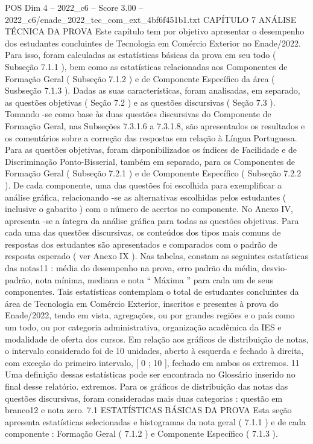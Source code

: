 \begin{textsample}{POS Dim 4 – 2022\_c6 – Score 3.00 – 2022\_c6/enade\_2022\_tec\_com\_ext\_4bf6f451b1.txt}  \label{ex:f4_pos_084}
CAPÍTULO 7 ANÁLISE TÉCNICA DA PROVA Este capítulo tem por objetivo apresentar o desempenho dos estudantes concluintes de Tecnologia em Comércio Exterior no Enade/2022.
Para isso, foram calculadas as estatísticas básicas da prova em seu todo ( Subseção 7.1.1 ), bem como as estatísticas relacionadas aos Componentes de Formação Geral ( Subseção 7.1.2 ) e de Componente Específico da área ( Susbseção 7.1.3 ).
Dadas as suas características, foram analisadas, em separado, as questões objetivas ( Seção 7.2 ) e as questões discursivas ( Seção 7.3 ).
Tomando -se como base às duas questões discursivas do Componente de Formação Geral, nas Subseções 7.3.1.6 a 7.3.1.8, são apresentados os resultados e os comentários sobre a correção das respostas em relação à Língua Portuguesa.
Para as questões objetivas, foram disponibilizados os índices de Facilidade e de Discriminação Ponto-Bisserial, também em separado, para os Componentes de Formação Geral ( Subseção 7.2.1 ) e de Componente Específico ( Subseção 7.2.2 ).
De cada componente, uma das questões foi escolhida para exemplificar a análise gráfica, relacionando -se as alternativas escolhidas pelos estudantes ( inclusive o gabarito ) com o número de acertos no componente.
No Anexo IV, apresenta -se a íntegra da análise gráfica para todas as questões objetivas.
Para cada uma das questões discursivas, os conteúdos dos tipos mais comuns de respostas dos estudantes são apresentados e comparados com o padrão de resposta esperado ( ver Anexo IX ).
Nas tabelas, constam as seguintes estatísticas das notas11 : média do desempenho na prova, erro padrão da média, desvio-padrão, nota mínima, mediana e nota “ Máxima ” para cada um de seus componentes.
Tais estatísticas contemplam o total de estudantes concluintes da área de Tecnologia em Comércio Exterior, inscritos e presentes à prova do Enade/2022, tendo em vista, agregações, ou por grandes regiões e o país como um todo, ou por categoria administrativa, organização acadêmica da IES e modalidade de oferta dos cursos.
Em relação aos gráficos de distribuição de notas, o intervalo considerado foi de 10 unidades, aberto à esquerda e fechado à direita, com exceção do primeiro intervalo, [ 0 ; 10 ], fechado em ambos os extremos. 11 Uma definição dessas estatísticas pode ser encontrada no Glossário inserido no final desse relatório. extremos.
Para os gráficos de distribuição das notas das questões discursivas, foram consideradas mais duas categorias : questão em branco12 e nota zero. 7.1 ESTATÍSTICAS BÁSICAS DA PROVA Esta seção apresenta estatísticas selecionadas e histogramas da nota geral ( 7.1.1 ) e de cada componente : Formação Geral ( 7.1.2 ) e Componente Específico ( 7.1.3 ).

\end{textsample}
